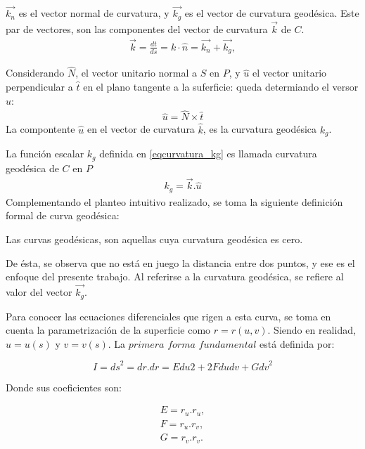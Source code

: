 \documentclass{endm}
\begin{document}
$\vec{k_n}$ es el vector normal de curvatura, y $\vec {k_g}$ es el vector de curvatura geod\'esica. Este par de vectores, son las componentes del vector de curvatura $\vec{k}$ de $C$. 
\small{
\begin{align} 
 \vec {k} = \frac{dt}{ds} = k \cdot \hat{n} = \vec {k_n} + \vec {k_g}, \label{eq1tangente}
\end{align}
}

Considerando $\hat{N}$, el vector unitario normal a $S$ en $P$, y $\hat{u}$ el vector unitario perpendicular a $\hat{t}$ en el plano tangente a la suferficie: queda determiando el versor $\hat{u}$:
\small{
\begin{align}
\hat{u} = \hat{N} \times \hat{t}
 \label{vector_u}
\end{align}
}
La compontente $\hat{u}$ en el vector de curvatura $\hat{k}$, es la curvatura geod\'esica $k_g$.

La funci\'on escalar $k_g$ definida en \ref{eqcurvatura_kg} es llamada curvatura geod\'esica de $C$ en $P$
\small{
\begin{align} 
k_g = \vec{k} .\hat{u}
 \label{eqcurvatura_kg}
\end{align}
}
Complementando el planteo intuitivo realizado, se toma la siguiente definici\'on formal de curva geod\'esica\cite{Patrikalakis}:

\begin{defn}
Las curvas geod\'esicas, son aquellas cuya curvatura geod\'esica es cero.
\end{defn}

De \'esta, se observa que no est\'a en juego la distancia entre dos puntos, y ese es el enfoque del presente trabajo. Al referirse a la curvatura geod\'esica, se refiere al valor del vector $\vec {k_g}$.


Para conocer las ecuaciones diferenciales que rigen a esta curva, se toma en cuenta la parametrizaci\'on de la superficie como $r=r(u,v)$. Siendo en realidad, $u=u(s)$ y $v=v(s)$. La $primera$ $forma$ $fundamental$ est\'a definida por:

$$I = {ds}^2 = dr.dr = E{du}2 + 2Fdudv + G{dv}^2$$

Donde sus coeficientes son:

{\small
\begin{align} 
E = r_u . r_u \label{eqE}, \\ 
F = r_u . r_v \label{eqF}, \\
G = r_v . r_v \label{eqG}.
\end{align}
}
\end{document}
